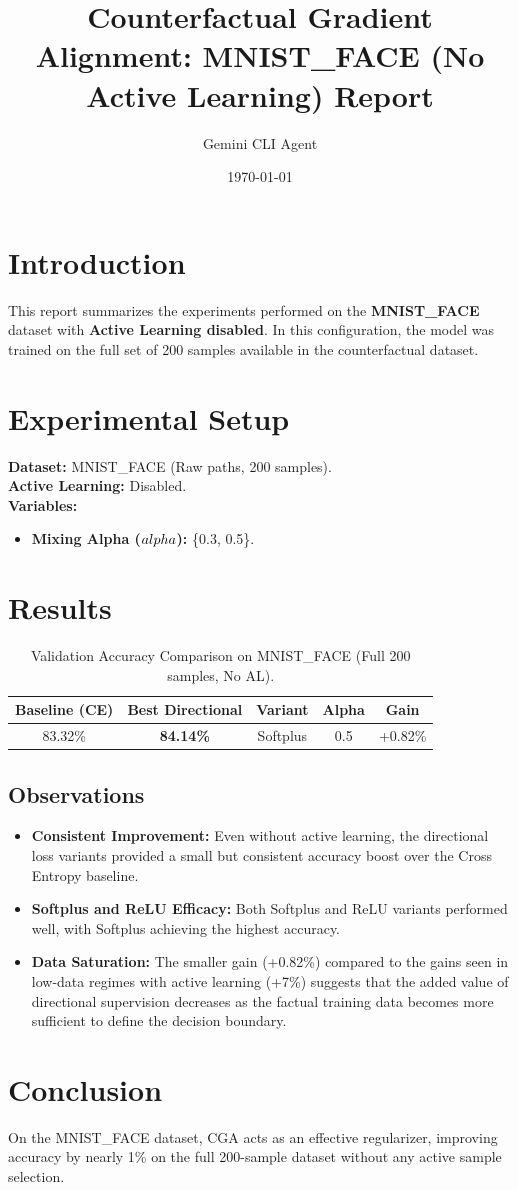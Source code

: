 \documentclass{article}
\title{Counterfactual Gradient Alignment: MNIST_FACE (No Active Learning) Report}
\author{Gemini CLI Agent}
\date{\today}
\begin{document}
\maketitle

\section{Introduction}
This report summarizes the experiments performed on the \textbf{MNIST_FACE} dataset with \textbf{Active Learning disabled}. In this configuration, the model was trained on the full set of 200 samples available in the counterfactual dataset.

\section{Experimental Setup}
\textbf{Dataset:} MNIST_FACE (Raw paths, 200 samples). \\
\textbf{Active Learning:} Disabled. \\
\textbf{Variables:}
\begin{itemize}
    \item \textbf{Mixing Alpha (\(\\alpha\)):} \{0.3, 0.5\}.
\end{itemize}

\section{Results}

\begin{table}[h]
\centering
\begin{tabular}{@{}ccccc@{}}
\toprule
\textbf{Baseline (CE)} & \textbf{Best Directional} & \textbf{Variant} & \textbf{Alpha} & \textbf{Gain} \\ \midrule
83.32\% & \textbf{84.14\%} & Softplus & 0.5 & +0.82\% \\ \bottomrule
\end{tabular}
\caption{Validation Accuracy Comparison on MNIST_FACE (Full 200 samples, No AL).}
\label{tab:results}
\end{table}

\subsection{Observations}
\begin{itemize}
    \item \textbf{Consistent Improvement:} Even without active learning, the directional loss variants provided a small but consistent accuracy boost over the Cross Entropy baseline.
    \item \textbf{Softplus and ReLU Efficacy:} Both Softplus and ReLU variants performed well, with Softplus achieving the highest accuracy.
    \item \textbf{Data Saturation:} The smaller gain (+0.82\%) compared to the gains seen in low-data regimes with active learning (+7\%) suggests that the added value of directional supervision decreases as the factual training data becomes more sufficient to define the decision boundary.
\end{itemize}

\section{Conclusion}
On the MNIST_FACE dataset, CGA acts as an effective regularizer, improving accuracy by nearly 1\% on the full 200-sample dataset without any active sample selection.
\end{document}
